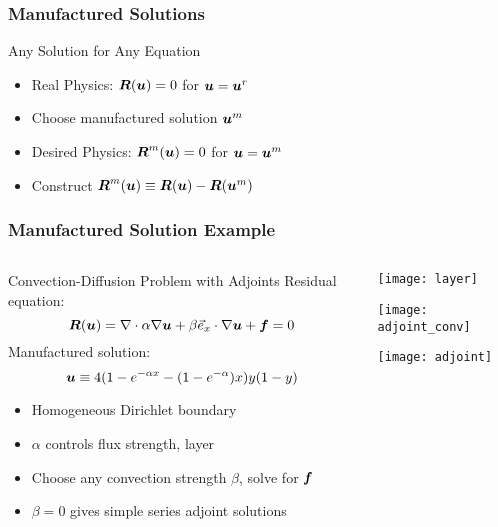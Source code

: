 \begin{frame}
\frametitle{Manufactured Solutions}
\begin{block}{Any Solution for Any Equation}
\begin{itemize}
\item Real Physics: ${\boldsymbol{R}}({\boldsymbol{u}}) = 0$ for ${\boldsymbol{u}} = {\boldsymbol{u}}^r$
\item Choose manufactured solution ${\boldsymbol{u}}^m$
\item Desired Physics: ${\boldsymbol{R}}^m({\boldsymbol{u}}) = 0$ for ${\boldsymbol{u}} = {\boldsymbol{u}}^m$
\item Construct ${\boldsymbol{R}}^m({\boldsymbol{u}}) \equiv {\boldsymbol{R}}({\boldsymbol{u}}) - {\boldsymbol{R}}({\boldsymbol{u}}^m)$
\end{itemize}
\end{block}

\end{frame}

\begin{frame}
\frametitle{Manufactured Solution Example}
\begin{columns}
\begin{column}{.7\textwidth}
\begin{block}{Convection-Diffusion Problem with Adjoints}
Residual equation:
\begin{equation*}
{\boldsymbol{R}}({\boldsymbol{u}}) = \nabla \cdot \alpha \nabla {\boldsymbol{u}} + \beta \vec{e}_x \cdot \nabla
{\boldsymbol{u}} + {\boldsymbol{f}} = 0
\end{equation*}
Manufactured solution:
\begin{equation*}
{\boldsymbol{u}} \equiv 4(1 - e^{-\alpha x} - (1 - e^{-\alpha})x)y(1-y)
\end{equation*}
\begin{itemize}
\item Homogeneous Dirichlet boundary
\item $\alpha$ controls flux strength, layer
\item Choose any convection strength $\beta$, solve for ${\boldsymbol{f}}$
\item $\beta = 0$ gives simple series adjoint solutions
\end{itemize}
\end{block}
\end{column}
\begin{column}{.3\textwidth}
\texttt{[image: layer]}

\texttt{[image: adjoint\_conv]}

\texttt{[image: adjoint]}
\end{column}
\end{columns}

\end{frame}


